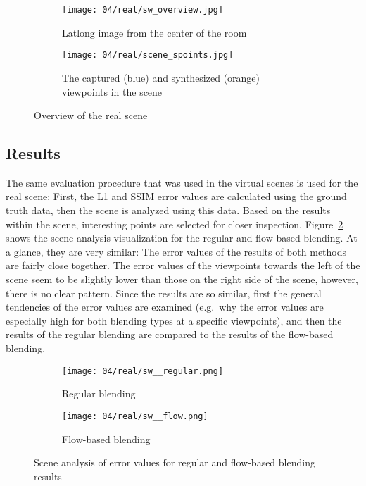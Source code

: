 \begin{figure}
\centering
    \hfill
    \begin{subfigure}[c]{0.65\textwidth}
            \centering
            \texttt{[image: 04/real/sw\_overview.jpg]}
            \caption{Latlong image from the center of the room}
    \end{subfigure}
    \hfill
    \begin{subfigure}[c]{0.33\textwidth}
            \centering
            \texttt{[image: 04/real/scene\_spoints.jpg]}
            \caption{The captured (blue) and synthesized (orange) viewpoints in the scene}
    \end{subfigure}
    \hfill
  \caption{Overview of the real scene}
  \label{fig:real_setup}
\end{figure}


\subsection{Results}
The same evaluation procedure that was used in the virtual scenes is used for the real scene: First, the L1 and SSIM error values are calculated using the ground truth data, then the scene is analyzed using this data. Based on the results within the scene, interesting points are selected for closer inspection.
Figure~\ref{fig:real_scene_analysis} shows the scene analysis visualization for the regular and flow-based blending. At a glance, they are very similar: The error values of the results of both methods are fairly close together. The error values of the viewpoints towards the left of the scene seem to be slightly lower than those on the right side of the scene, however, there is no clear pattern. Since the results are so similar, first the general tendencies of the error values are examined (e.g.\ why the error values are especially high for both blending types at a specific viewpoints), and then the results of the regular blending are compared to the results of the flow-based blending.

\begin{figure}
\centering
    \hfill
    \begin{subfigure}[b]{0.45\textwidth}
            \centering
            \texttt{[image: 04/real/sw\_\_regular.png]}
            \caption{Regular blending}
    \end{subfigure}
    \hfill
    \begin{subfigure}[b]{0.45\textwidth}
            \centering
            \texttt{[image: 04/real/sw\_\_flow.png]}
            \caption{Flow-based blending}
    \end{subfigure}
    \hfill
  \caption{Scene analysis of error values for regular and flow-based blending results}
  \label{fig:real_scene_analysis}
\end{figure}


